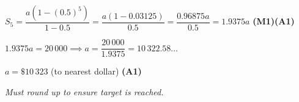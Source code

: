 \documentclass[12pt, twoside]{article}
\begin{document}
\begin{enumerate}[itemsep=0.15cm]
\begin{enumerate}[itemsep=0.3cm]
\begin{enumerate}[itemsep=0.2cm]
    $S_5 = \dfrac{a(1 - (0.5)^5)}{1 - 0.5} = \dfrac{a(1 - 0.03125)}{0.5}
    = \dfrac{0.96875a}{0.5} = 1.9375a$ \hfill \textbf{(M1)(A1)}

    $1.9375a = 20\,000 \implies a = \dfrac{20\,000}{1.9375} = 10\,322.58\ldots$

    $a = \$10\,323$ (to nearest dollar) \hfill \textbf{(A1)}

    \textit{Must round up to ensure target is reached.}
  \end{enumerate}
\end{enumerate}

\end{enumerate}
\end{document}
